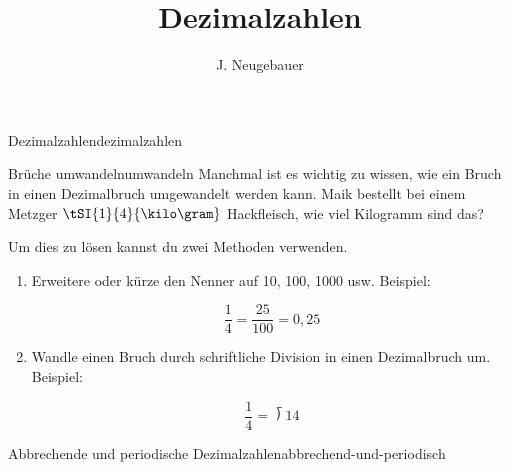 \documentclass[12pt,a5paper,landscape]{scrartcl}
\author{J. Neugebauer}
\title{Dezimalzahlen}
\date{\Heute}
\begin{document}
	\begin{hilfekarte}{Dezimalzahlen}{dezimalzahlen}

	\end{hilfekarte}
	
	\begin{hilfekarte}{Brüche umwandeln}{umwandeln}
		Manchmal ist es wichtig zu wissen, wie ein Bruch in einen Dezimalbruch umgewandelt werden kann. Maik bestellt bei einem Metzger $\tSI{1}{4}{\kilo\gram}$ Hackfleisch, wie viel Kilogramm sind das? 
		
		Um dies zu lösen kannst du zwei Methoden verwenden.
		\begin{enumerate}
			\item Erweitere oder kürze den Nenner auf 10, 100, 1000 usw. Beispiel:
			
			\[ \dfrac{1}{4} = \dfrac{25	}{100} = 0,25 \]
			\item Wandle einen Bruch durch schriftliche Division in einen Dezimalbruch um. Beispiel:
			
			\[ \dfrac{1}{4} = \longdivision{1}{4} \]
		\end{enumerate}
	\end{hilfekarte}
			
	\begin{hilfekarte}{Abbrechende und periodische Dezimalzahlen}{abbrechend-und-periodisch}

	\end{hilfekarte}
	
\end{document}
